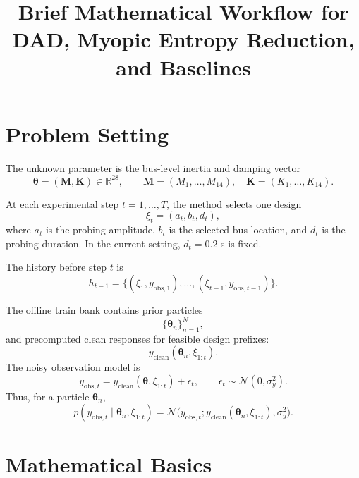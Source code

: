 \documentclass[11pt]{article}
\title{Brief Mathematical Workflow for DAD, Myopic Entropy Reduction, and Baselines}
\author{}
\date{}
\newcommand{\thetaVec}{\bm{\theta}}
\newcommand{\Mvec}{\bm{M}}
\newcommand{\Kvec}{\bm{K}}
\newcommand{\Normal}{\mathcal{N}}
\begin{document}
\maketitle

\section{Problem Setting}

The unknown parameter is the bus-level inertia and damping vector
\begin{equation}
\thetaVec=(\Mvec,\Kvec)\in \mathbb{R}^{28},
\qquad
\Mvec=(M_1,\ldots,M_{14}),\quad
\Kvec=(K_1,\ldots,K_{14}).
\end{equation}

At each experimental step $t=1,\ldots,T$, the method selects one design
\begin{equation}
\xi_t=(a_t,b_t,d_t),
\end{equation}
where $a_t$ is the probing amplitude, $b_t$ is the selected bus location, and $d_t$ is the probing duration. In the current setting, $d_t=0.2$ s is fixed.

The history before step $t$ is
\begin{equation}
 h_{t-1}=\{(\xi_1,y_{\mathrm{obs},1}),\ldots,(\xi_{t-1},y_{\mathrm{obs},t-1})\}.
\end{equation}

The offline train bank contains prior particles
\begin{equation}
\{\thetaVec_n\}_{n=1}^{N},
\end{equation}
and precomputed clean responses for feasible design prefixes:
\begin{equation}
 y_{\mathrm{clean}}(\thetaVec_n,\xi_{1:t}).
\end{equation}
The noisy observation model is
\begin{equation}
 y_{\mathrm{obs},t}
 = y_{\mathrm{clean}}(\thetaVec,\xi_{1:t})+\epsilon_t,
 \qquad
 \epsilon_t\sim \Normal(0,\sigma_y^2).
\end{equation}
Thus, for a particle $\thetaVec_n$,
\begin{equation}
 p(y_{\mathrm{obs},t}\mid \thetaVec_n,\xi_{1:t})
 =
 \Normal\!\big(y_{\mathrm{obs},t};
 y_{\mathrm{clean}}(\thetaVec_n,\xi_{1:t}),
 \sigma_y^2\big).
\end{equation}

\section{Mathematical Basics}
\end{document}
